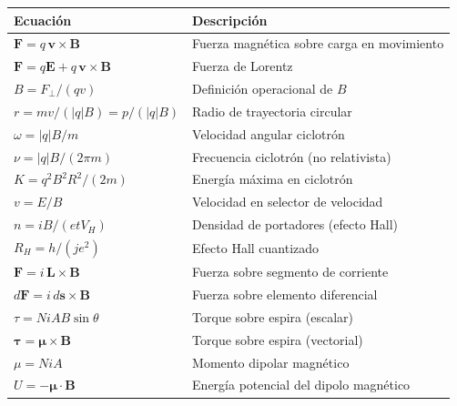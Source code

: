 \documentclass[12pt, letterpaper]{report}
\numberwithin{equation}{section}
\newcommand{\vB}[1]{\boldsymbol{#1}}          %
\begin{document}
\begin{center}
\renewcommand{\arraystretch}{1.7}
\begin{longtable}{p{}p{}}
  \toprule
  \textbf{Ecuación} & \textbf{Descripción} \\
  \midrule
  $\displaystyle\vB{F}=q\,\vB{v}\times\vB{B}$ &
        Fuerza magnética sobre carga en movimiento \\
  $\displaystyle\vB{F}=q\vB{E}+q\,\vB{v}\times\vB{B}$ &
        Fuerza de Lorentz \\
  $\displaystyle B=F_\perp/(qv)$ &
        Definición operacional de $B$ \\
  $\displaystyle r=mv/(|q|B)=p/(|q|B)$ &
        Radio de trayectoria circular \\
  $\displaystyle\omega=|q|B/m$ &
        Velocidad angular ciclotrón \\
  $\displaystyle\nu=|q|B/(2\pi m)$ &
        Frecuencia ciclotrón (no relativista) \\
  $\displaystyle K=q^2B^2R^2/(2m)$ &
        Energía máxima en ciclotrón \\
  $\displaystyle v=E/B$ &
        Velocidad en selector de velocidad \\
  $\displaystyle n=iB/(etV_H)$ &
        Densidad de portadores (efecto Hall) \\
  $\displaystyle R_H=h/(je^2)$ &
        Efecto Hall cuantizado \\
  $\displaystyle\vB{F}=i\,\vB{L}\times\vB{B}$ &
        Fuerza sobre segmento de corriente \\
  $\displaystyle d\vB{F}=i\,d\vB{s}\times\vB{B}$ &
        Fuerza sobre elemento diferencial \\
  $\displaystyle\tau=NiAB\sin\theta$ &
        Torque sobre espira (escalar) \\
  $\displaystyle\vB{\tau}=\vB{\mu}\times\vB{B}$ &
        Torque sobre espira (vectorial) \\
  $\displaystyle\mu=NiA$ &
        Momento dipolar magnético \\
  $\displaystyle U=-\vB{\mu}\cdot\vB{B}$ &
        Energía potencial del dipolo magnético \\
  \bottomrule
\end{longtable}
\end{center}

\clearpage

\end{document}

